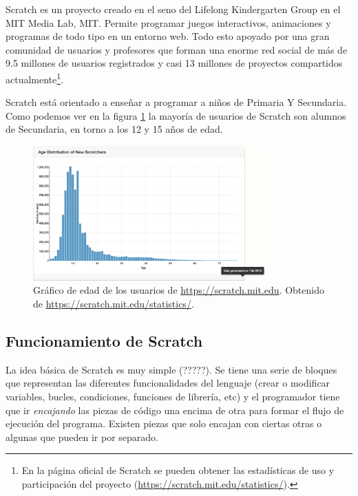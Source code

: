 Scratch\cite{scratch} es un proyecto creado en el seno del Lifelong Kindergarten Group en el MIT Media Lab, \acrfull{MIT}. Permite programar juegos interactivos, animaciones y programas de todo tipo en un entorno web. Todo esto apoyado por una gran comunidad de usuarios y profesores que forman una enorme red social de más de 9.5 millones de usuarios registrados y casi 13 millones de proyectos compartidos actualmente\footnote{En la página oficial de Scratch se pueden obtener las estadísticas de uso y participación del proyecto (\url{https://scratch.mit.edu/statistics/}).}.

Scratch está orientado a enseñar a programar a niños de Primaria Y Secundaria. Como podemos ver en la figura \ref{fig:scratch-edad} la mayoría de usuarios de Scratch son alumnos de Secundaria, en torno a los 12 y 15 años de edad.

\begin{figure}[!ht]
	\begin{centering}
		\includegraphics[width=0.8\textwidth]{images/scratch-edad.png}
			\caption{Gráfico de edad de los usuarios de \url{https://scratch.mit.edu}. Obtenido de \url{https://scratch.mit.edu/statistics/}.}
				\label{fig:scratch-edad}
	\end{centering}
\end{figure}


\subsection{Funcionamiento de Scratch}
\label{sec:scratch-funcionamiento}

La idea básica de Scratch {\color{red}es muy simple (?????)}. Se tiene una serie de bloques que representan las diferentes funcionalidades del lenguaje (crear o modificar variables, bucles, condiciones, funciones de librería, etc) y el programador tiene que ir \emph{encajando} las piezas de código una encima de otra para formar el flujo de ejecución del programa. Existen piezas que solo encajan con ciertas otras o algunas que pueden ir por separado.


